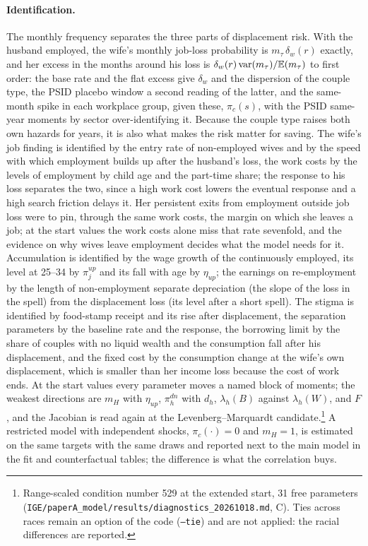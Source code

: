 \paragraph{Identification.} The monthly frequency separates the three parts of displacement risk. With the husband
employed, the wife's monthly job-loss probability is $m_\tau\,\delta_w(r)$ exactly, and her excess in the months
around his loss is $\delta_w(r)\,\mathrm{var}(m_\tau)/\mathbb{E}(m_\tau)$ to first order: the base rate and the flat excess
give $\delta_w$ and the dispersion of the couple type, the PSID placebo window a second reading of the latter, and the
same-month spike in each workplace group, given these, $\pi_c(s)$, with the PSID same-year moments by sector
over-identifying it. Because the couple type raises both own hazards for years, it is also what makes the risk matter
for saving. The wife's job finding is identified by the entry rate of non-employed wives and by the speed with which
employment builds up after the husband's loss, the work costs by the levels of employment by child age and the
part-time share; the response to his loss separates the two, since a high work cost lowers the eventual response and a
high search friction delays it. Her persistent exits from employment outside job loss were to pin, through the same
work costs, the margin on which she leaves a job; at the start values the work costs alone miss that rate sevenfold,
and the evidence on why wives leave employment decides what the model needs for it. Accumulation is identified by the
wage growth of the continuously employed, its level at 25--34 by $\pi^{up}_j$ and its fall with age by
$\eta_{up}$; the earnings on re-employment by the
length of non-employment separate depreciation (the slope of the loss in the spell) from the displacement loss (its
level after a short spell). The stigma is identified by food-stamp receipt and its rise after displacement, the
separation parameters by the baseline rate and the response, the borrowing limit by the share of couples with no liquid
wealth and the consumption fall after his displacement, and the fixed cost by the consumption change at the wife's own
displacement, which is smaller than her income loss because the cost of work ends. At the start values every
parameter moves a named block of moments; the weakest directions are $m_H$ with $\eta_{up}$, $\pi^{dn}_h$ with $d_h$,
$\lambda_h(B)$ against $\lambda_h(W)$, and $F$, and the Jacobian is read again at the Levenberg--Marquardt
candidate.\footnote{Range-scaled condition number 529 at the extended start, 31 free parameters
(\texttt{IGE/paperA\_model/results/diagnostics\_20261018.md}, C). Ties across races remain an option of the code
(\texttt{--tie}) and are not applied: the racial differences are reported.} A restricted model with
independent shocks, $\pi_c(\cdot) = 0$ and $m_H = 1$, is estimated on the same targets with the same draws and
reported next to the main model in the fit and counterfactual tables; the difference is what the correlation buys.

